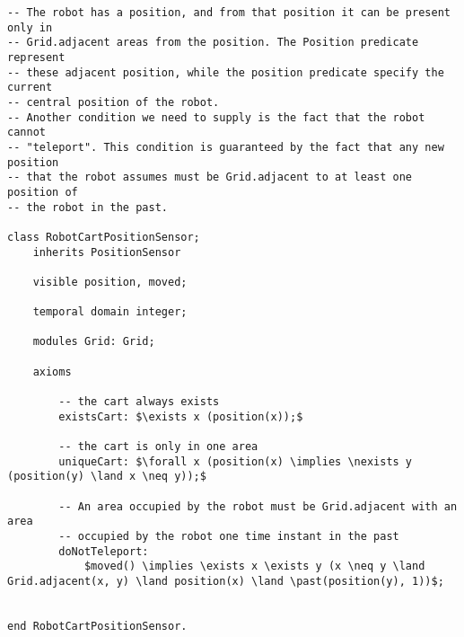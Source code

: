 \begin{lstlisting}[fontadjust, mathescape, frame=single] 
-- The robot has a position, and from that position it can be present only in
-- Grid.adjacent areas from the position. The Position predicate represent 
-- these adjacent position, while the position predicate specify the current 
-- central position of the robot.
-- Another condition we need to supply is the fact that the robot cannot 
-- "teleport". This condition is guaranteed by the fact that any new position
-- that the robot assumes must be Grid.adjacent to at least one position of 
-- the robot in the past.

class RobotCartPositionSensor; 
    inherits PositionSensor
    
    visible position, moved;
    
    temporal domain integer;

    modules Grid: Grid;
    
    axioms
    
        -- the cart always exists
        existsCart: $\exists x (position(x));$

        -- the cart is only in one area
        uniqueCart: $\forall x (position(x) \implies \nexists y (position(y) \land x \neq y));$         

        -- An area occupied by the robot must be Grid.adjacent with an area
        -- occupied by the robot one time instant in the past
        doNotTeleport:
            $moved() \implies \exists x \exists y (x \neq y \land Grid.adjacent(x, y) \land position(x) \land \past(position(y), 1))$;


end RobotCartPositionSensor.
\end{lstlisting}